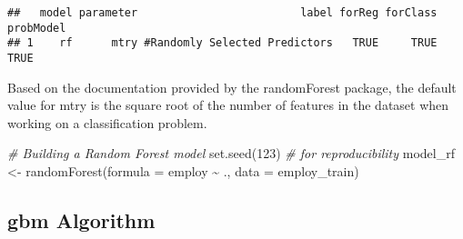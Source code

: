 \documentclass[
]{book}
\newenvironment{Shaded}{\begin{snugshade}}{\end{snugshade}}
\newcommand{\AttributeTok}[1]{\textcolor[rgb]{0.77,0.63,0.00}{#1}}
\newcommand{\CommentTok}[1]{\textcolor[rgb]{0.56,0.35,0.01}{\textit{#1}}}
\newcommand{\DecValTok}[1]{\textcolor[rgb]{0.00,0.00,0.81}{#1}}
\newcommand{\FunctionTok}[1]{\textcolor[rgb]{0.00,0.00,0.00}{#1}}
\newcommand{\NormalTok}[1]{#1}
\newcommand{\OtherTok}[1]{\textcolor[rgb]{0.56,0.35,0.01}{#1}}
\newcommand{\SpecialCharTok}[1]{\textcolor[rgb]{0.00,0.00,0.00}{#1}}
\begin{document}
\begin{verbatim}
##   model parameter                         label forReg forClass probModel
## 1    rf      mtry #Randomly Selected Predictors   TRUE     TRUE      TRUE
\end{verbatim}

Based on the documentation provided by the randomForest package, the default
value for mtry is the square root of the number of features in the dataset when working on a classification problem.

\begin{Shaded}
\begin{Highlighting}[]
\CommentTok{\# Building a Random Forest model}
\FunctionTok{set.seed}\NormalTok{(}\DecValTok{123}\NormalTok{)  }\CommentTok{\# for reproducibility}
\NormalTok{model\_rf }\OtherTok{\textless{}{-}} \FunctionTok{randomForest}\NormalTok{(}\AttributeTok{formula =}\NormalTok{ employ }\SpecialCharTok{\textasciitilde{}}\NormalTok{ ., }
                         \AttributeTok{data =}\NormalTok{ employ\_train)}
\end{Highlighting}
\end{Shaded}

\hypertarget{gbm-algorithm}{%
\subsection{gbm Algorithm}\label{gbm-algorithm}}
\end{document}
